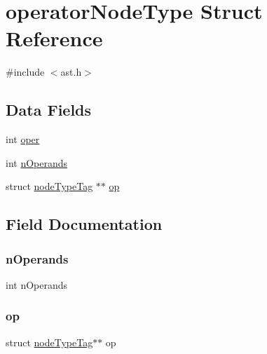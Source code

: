 \hypertarget{structoperator_node_type}{}\section{operator\+Node\+Type Struct Reference}
\label{structoperator_node_type}


{\ttfamily \#include $<$ast.\+h$>$}

\subsection*{Data Fields}
\begin{DoxyCompactItemize}
\item 
int \hyperlink{structoperator_node_type_aded5bacd1ab04cf5d81f2007152472e1}{oper}
\item 
int \hyperlink{structoperator_node_type_ab7460480665b753765ebd63fbcc3a7fe}{n\+Operands}
\item 
struct \hyperlink{structnode_type_tag}{node\+Type\+Tag} $\ast$$\ast$ \hyperlink{structoperator_node_type_a435ef48a6aa3b02264183c56f839851d}{op}
\end{DoxyCompactItemize}


\subsection{Field Documentation}
\mbox{\label{structoperator_node_type_ab7460480665b753765ebd63fbcc3a7fe}} 
\subsubsection{\texorpdfstring{n\+Operands}{nOperands}}
{\footnotesize\ttfamily int n\+Operands}

\mbox{\label{structoperator_node_type_a435ef48a6aa3b02264183c56f839851d}} 
\subsubsection{\texorpdfstring{op}{op}}
{\footnotesize\ttfamily struct \hyperlink{structnode_type_tag}{node\+Type\+Tag}$\ast$$\ast$ op}

